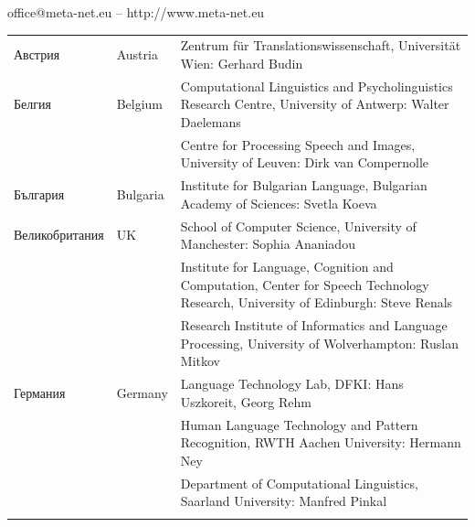 \documentclass[]{../../metanetpaper}
\begin{document}
\vfill
\centerline{office@meta-net.eu -- http://www.meta-net.eu}

\cleardoublepage

\appendix
{}

%

  
\cleardoublepage

\label{metanetmembers}

\small

\begin{longtable}{@{}llp{110mm}@{}}
  Австрия & \textcolor{grey1}{Austria} & Zentrum für
  Translationswissenschaft, Universität Wien: Gerhard Budin\\
  \addlinespace 
  Белгия & \textcolor{grey1}{Belgium} & Computational Linguistics and
  Psycholinguistics Research Centre, University of Antwerp: Walter
  Daelemans\\ \addlinespace
  & & Centre for Processing Speech and Images, University of Leuven:\newline
Dirk van Compernolle \\ \addlinespace
  България & \textcolor{grey1}{Bulgaria} & Institute for Bulgarian
  Language, Bulgarian Academy of Sciences: Svetla Koeva \\
  \addlinespace
  Великобритания & \textcolor{grey1}{UK} & School of Computer Science, University of Manchester: Sophia Ananiadou \\ \addlinespace 
  & & Institute for Language, Cognition and Computation, Center for Speech Technology Research, University of Edinburgh: Steve Renals \\ \addlinespace 
  & & Research Institute of Informatics and Language Processing, University of Wolverhampton: Ruslan Mitkov \\ \addlinespace 
  Германия & \textcolor{grey1}{Germany} & Language Technology Lab, DFKI: Hans Uszkoreit, Georg Rehm\\ \addlinespace
  & & Human Language Technology and Pattern Recognition, RWTH Aachen University: Hermann Ney \\ \addlinespace
  & & Department of Computational Linguistics, Saarland University:
  Manfred Pinkal\\ \addlinespace 

\end{longtable}
\end{document}
